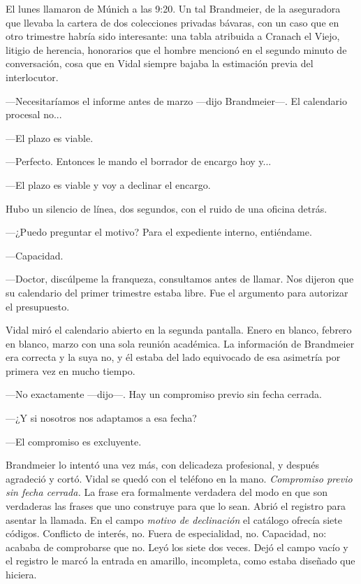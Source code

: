 El lunes llamaron de Múnich a las 9:20. Un tal Brandmeier, de la aseguradora que llevaba la cartera de dos colecciones privadas bávaras, con un caso que en otro trimestre habría sido interesante: una tabla atribuida a Cranach el Viejo, litigio de herencia, honorarios que el hombre mencionó en el segundo minuto de conversación, cosa que en Vidal siempre bajaba la estimación previa del interlocutor.

---Necesitaríamos el informe antes de marzo ---dijo Brandmeier---. El calendario procesal no...

---El plazo es viable.

---Perfecto. Entonces le mando el borrador de encargo hoy y...

---El plazo es viable y voy a declinar el encargo.

Hubo un silencio de línea, dos segundos, con el ruido de una oficina detrás.

---¿Puedo preguntar el motivo? Para el expediente interno, entiéndame.

---Capacidad.

---Doctor, discúlpeme la franqueza, consultamos antes de llamar. Nos dijeron que su calendario del primer trimestre estaba libre. Fue el argumento para autorizar el presupuesto.

Vidal miró el calendario abierto en la segunda pantalla. Enero en blanco, febrero en blanco, marzo con una sola reunión académica. La información de Brandmeier era correcta y la suya no, y él estaba del lado equivocado de esa asimetría por primera vez en mucho tiempo.

---No exactamente ---dijo---. Hay un compromiso previo sin fecha cerrada.

---¿Y si nosotros nos adaptamos a esa fecha?

---El compromiso es excluyente.

Brandmeier lo intentó una vez más, con delicadeza profesional, y después agradeció y cortó. Vidal se quedó con el teléfono en la mano. \textit{Compromiso previo sin fecha cerrada.} La frase era formalmente verdadera del modo en que son verdaderas las frases que uno construye para que lo sean. Abrió el registro para asentar la llamada. En el campo \textit{motivo de declinación} el catálogo ofrecía siete códigos. Conflicto de interés, no. Fuera de especialidad, no. Capacidad, no: acababa de comprobarse que no. Leyó los siete dos veces. Dejó el campo vacío y el registro le marcó la entrada en amarillo, incompleta, como estaba diseñado que hiciera.

